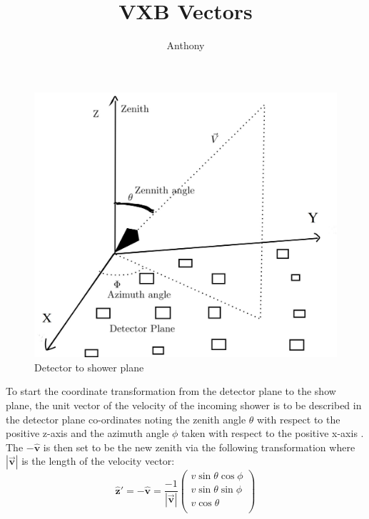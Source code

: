 \documentclass[11pt]{article}
\begin{document}
\author{Anthony}
\title{VXB Vectors}
\maketitle

\begin{figure}[h]
\centering
  \includegraphics[scale=0.2]{vvv.JPG}
  \caption{Detector to shower plane }
  \label{fig:boat1}
\end{figure}

To start the coordinate transformation from the detector plane to the show plane, the unit vector of the velocity of the incoming shower is to be  described in the detector plane co-ordinates noting the zenith angle $\theta$ with respect to the positive z-axis and the azimuth angle $\phi$ taken with respect to the positive x-axis  . The $\mathbf{-\hat{v}}$ is then set to be the new zenith via the following transformation where $\mathbf{|\vec{v}|}$ is the length of the velocity vector:
\begin{equation}
    \mathbf{\hat{z}'}=\mathbf{-\hat{v}} = \frac{-1}{\left|\mathbf{\vec{v}}\right|}\left(
    \begin{array}{c}
    v\sin\theta \cos\phi \\ 	
    v\sin\theta \sin\phi \\ 
    v\cos\theta \\
\end{array} 
\right)
\end{equation}
\end{document}

